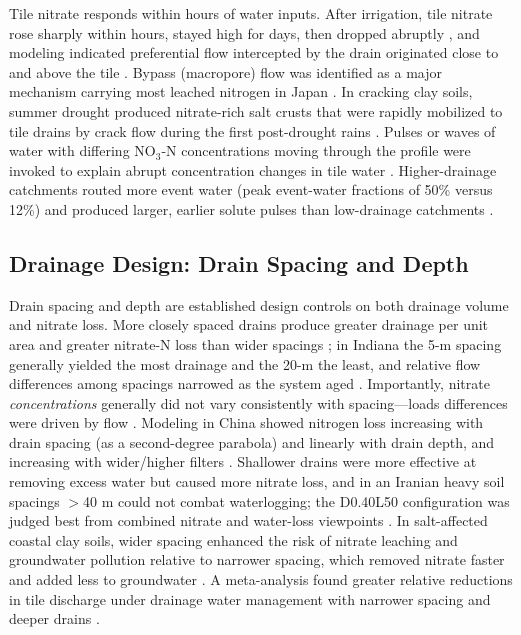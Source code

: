 \documentclass[11pt]{article}
\begin{document}
Tile nitrate responds within hours of water inputs. After irrigation, tile nitrate rose sharply within hours, stayed high for days, then dropped abruptly \parencite{Mohanty1998}, and modeling indicated preferential flow intercepted by the drain originated close to and above the tile \parencite{Mohanty1998}. Bypass (macropore) flow was identified as a major mechanism carrying most leached nitrogen in Japan \parencite{Hayashi1999}. In cracking clay soils, summer drought produced nitrate-rich salt crusts that were rapidly mobilized to tile drains by crack flow during the first post-drought rains \parencite{Colombani2016}. Pulses or waves of water with differing NO$_3$-N concentrations moving through the profile were invoked to explain abrupt concentration changes in tile water \parencite{BAKER1975}. Higher-drainage catchments routed more event water (peak event-water fractions of 50\% versus 12\%) and produced larger, earlier solute pulses than low-drainage catchments \parencite{Kennedy2012}.

\subsection{Drainage Design: Drain Spacing and Depth}

Drain spacing and depth are established design controls on both drainage volume and nitrate loss. More closely spaced drains produce greater drainage per unit area and greater nitrate-N loss than wider spacings \parencite{Kladivko2021,Kladivko2004}; in Indiana the 5-m spacing generally yielded the most drainage and the 20-m the least, and relative flow differences among spacings narrowed as the system aged \parencite{Kladivko2004,Kladivko2021}. Importantly, nitrate \emph{concentrations} generally did not vary consistently with spacing---loads differences were driven by flow \parencite{Kladivko2021,Kladivko2004}. Modeling in China showed nitrogen loss increasing with drain spacing (as a second-degree parabola) and linearly with drain depth, and increasing with wider/higher filters \parencite{Tao2021}. Shallower drains were more effective at removing excess water but caused more nitrate loss, and in an Iranian heavy soil spacings $>$40 m could not combat waterlogging; the D0.40L50 configuration was judged best from combined nitrate and water-loss viewpoints \parencite{Hashemi2020}. In salt-affected coastal clay soils, wider spacing enhanced the risk of nitrate leaching and groundwater pollution relative to narrower spacing, which removed nitrate faster and added less to groundwater \parencite{Singh2002,Singh2007,Singh2001c}. A meta-analysis found greater relative reductions in tile discharge under drainage water management with narrower spacing and deeper drains \parencite{Ross2016}.
\end{document}
